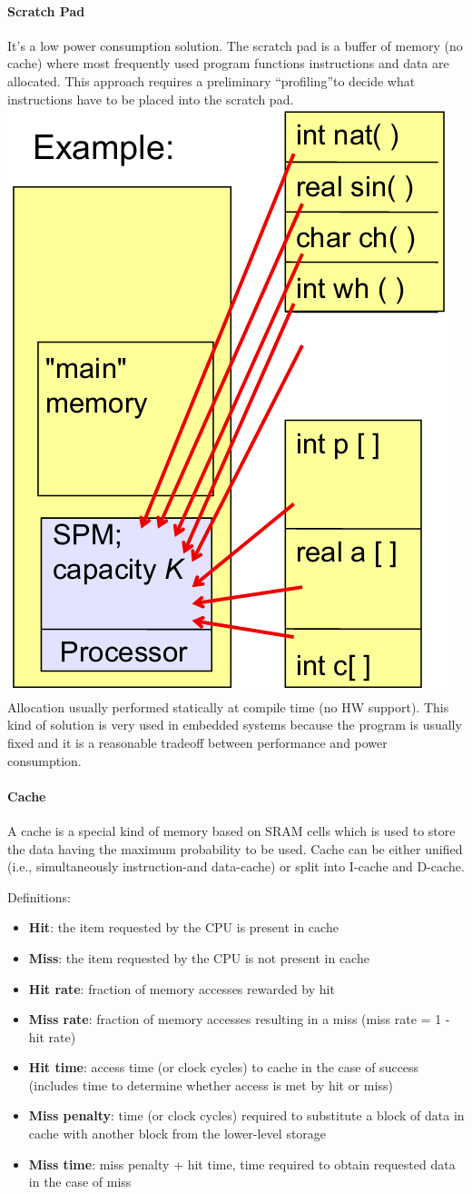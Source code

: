 \paragraph{Scratch Pad}
It's a low power consumption solution.
The scratch pad is a buffer of memory (no cache) where most frequently used program functions instructions and data are allocated.
This approach requires a preliminary “profiling”to decide what instructions have to be placed into the scratch pad.
\includegraphics[width=.5\textwidth]{images/memory_scratch_pad.png}
Allocation usually performed statically at compile time (no HW support).
This kind of solution is very used in embedded systems because the program is usually fixed and it is a reasonable tradeoff between performance and power consumption.

\paragraph{Cache}
A cache is a special kind of memory based on SRAM cells which is used to store the data having the maximum probability to be used.
Cache can be either unified (i.e., simultaneously instruction-and data-cache) or split into I-cache and D-cache.

Definitions:
\begin{itemize}
    \item \textbf{Hit}: the item requested by the CPU is present in cache
    \item \textbf{Miss}: the item requested by the CPU is not present in cache
    \item \textbf{Hit rate}: fraction of memory accesses rewarded by hit
    \item \textbf{Miss rate}: fraction of memory accesses resulting in a miss (miss rate = 1 -hit rate)
    \item \textbf{Hit time}: access time (or clock cycles) to cache in the case of success (includes time to determine whether access is met by hit or miss)
    \item \textbf{Miss penalty}: time (or clock cycles) required to substitute a block of data in cache with another block from the lower-level storage
    \item \textbf{Miss time}: miss penalty + hit time, time required to obtain requested data in the case of miss
\end{itemize}

